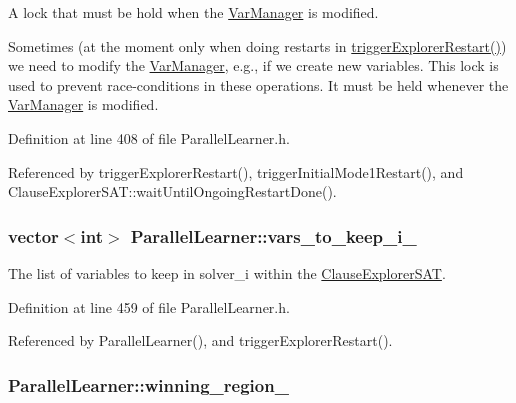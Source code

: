 A lock that must be hold when the \hyperlink{classVarManager}{Var\-Manager} is modified. 

Sometimes (at the moment only when doing restarts in \hyperlink{classParallelLearner_a2b8e4330afb7e99c19d2d7da15c30cc3}{trigger\-Explorer\-Restart()}) we need to modify the \hyperlink{classVarManager}{Var\-Manager}, e.\-g., if we create new variables. This lock is used to prevent race-\/conditions in these operations. It must be held whenever the \hyperlink{classVarManager}{Var\-Manager} is modified. 

Definition at line 408 of file Parallel\-Learner.\-h.



Referenced by trigger\-Explorer\-Restart(), trigger\-Initial\-Mode1\-Restart(), and Clause\-Explorer\-S\-A\-T\-::wait\-Until\-Ongoing\-Restart\-Done().

\hypertarget{classParallelLearner_a959125f97b90cff7b2a08868ec48c0a1}{
\subsubsection[{vars\-\_\-to\-\_\-keep\-\_\-i\-\_\-}]{\setlength{\rightskip}{0pt plus 5cm}vector$<$int$>$ Parallel\-Learner\-::vars\-\_\-to\-\_\-keep\-\_\-i\-\_\-\hspace{0.3cm}{\ttfamily [protected]}}}\label{classParallelLearner_a959125f97b90cff7b2a08868ec48c0a1}


The list of variables to keep in solver\-\_\-i within the \hyperlink{classClauseExplorerSAT}{Clause\-Explorer\-S\-A\-T}. 



Definition at line 459 of file Parallel\-Learner.\-h.



Referenced by Parallel\-Learner(), and trigger\-Explorer\-Restart().

\hypertarget{classParallelLearner_a7c8383543ff98d7a0356a237756dcdd6}{
\subsubsection[{winning\-\_\-region\-\_\-}]{ Parallel\-Learner\-::winning\-\_\-region\-\_\-}}\label{classParallelLearner_a7c8383543ff98d7a0356a237756dcdd6}


